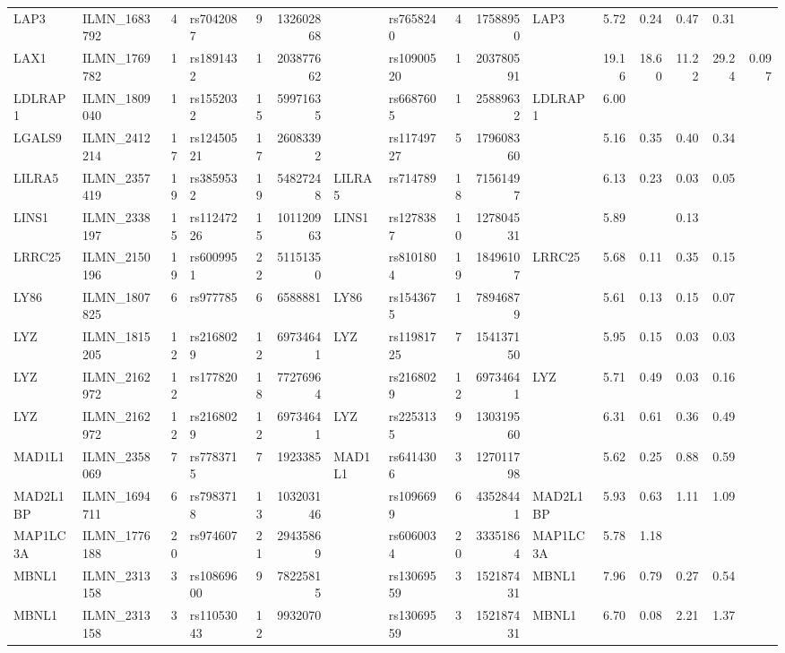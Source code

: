 \documentclass{article}
\begin{document}
\begin{landscape}
{\begin{ThreePartTable}
\begin{longtable}{|llr|lrrl|lrrl|rrrr|r|}
LAP3 & ILMN\_1683792 & 4 & rs7042087 & 9 & 132602868 &  & rs7658240 & 4 & 17588950 & LAP3 & 5.72 & 0.24 & 0.47 & 0.31 &  \\
LAX1 & ILMN\_1769782 & 1 & rs1891432 & 1 & 203877662 &  & rs10900520 & 1 & 203780591 &  & 19.16 & 18.60 & 11.22 & 29.24 & 0.097 \\
LDLRAP1 & ILMN\_1809040 & 1 & rs1552032 & 15 & 59971635 &  & rs6687605 & 1 & 25889632 & LDLRAP1 & 6.00 &  &  &  &  \\
LGALS9 & ILMN\_2412214 & 17 & rs12450521 & 17 & 26083392 &  & rs11749727 & 5 & 179608360 &  & 5.16 & 0.35 & 0.40 & 0.34 &  \\
LILRA5 & ILMN\_2357419 & 19 & rs3859532 & 19 & 54827248 & LILRA5 & rs714789 & 18 & 71561497 &  & 6.13 & 0.23 & 0.03 & 0.05 &  \\
LINS1 & ILMN\_2338197 & 15 & rs11247226 & 15 & 101120963 & LINS1 & rs1278387 & 10 & 127804531 &  & 5.89 &  & 0.13 &  &  \\
LRRC25 & ILMN\_2150196 & 19 & rs6009951 & 22 & 51151350 &  & rs8101804 & 19 & 18496107 & LRRC25 & 5.68 & 0.11 & 0.35 & 0.15 &  \\
LY86 & ILMN\_1807825 & 6 & rs977785 & 6 & 6588881 & LY86 & rs1543675 & 1 & 78946879 &  & 5.61 & 0.13 & 0.15 & 0.07 &  \\
LYZ & ILMN\_1815205 & 12 & rs2168029 & 12 & 69734641 & LYZ & rs11981725 & 7 & 154137150 &  & 5.95 & 0.15 & 0.03 & 0.03 &  \\
LYZ & ILMN\_2162972 & 12 & rs177820 & 18 & 77276964 &  & rs2168029 & 12 & 69734641 & LYZ & 5.71 & 0.49 & 0.03 & 0.16 &  \\
LYZ & ILMN\_2162972 & 12 & rs2168029 & 12 & 69734641 & LYZ & rs2253135 & 9 & 130319560 &  & 6.31 & 0.61 & 0.36 & 0.49 &  \\
MAD1L1 & ILMN\_2358069 & 7 & rs7783715 & 7 & 1923385 & MAD1L1 & rs6414306 & 3 & 127011798 &  & 5.62 & 0.25 & 0.88 & 0.59 &  \\
MAD2L1BP & ILMN\_1694711 & 6 & rs7983718 & 13 & 103203146 &  & rs1096699 & 6 & 43528441 & MAD2L1BP & 5.93 & 0.63 & 1.11 & 1.09 &  \\
MAP1LC3A & ILMN\_1776188 & 20 & rs974607 & 21 & 29435869 &  & rs6060034 & 20 & 33351864 & MAP1LC3A & 5.78 & 1.18 &  &  &  \\
MBNL1 & ILMN\_2313158 & 3 & rs10869600 & 9 & 78225815 &  & rs13069559 & 3 & 152187431 & MBNL1 & 7.96 & 0.79 & 0.27 & 0.54 &  \\
MBNL1 & ILMN\_2313158 & 3 & rs11053043 & 12 & 9932070 &  & rs13069559 & 3 & 152187431 & MBNL1 & 6.70 & 0.08 & 2.21 & 1.37 &  \\

\end{longtable}
\end{ThreePartTable}}
\end{landscape}
\end{document}
